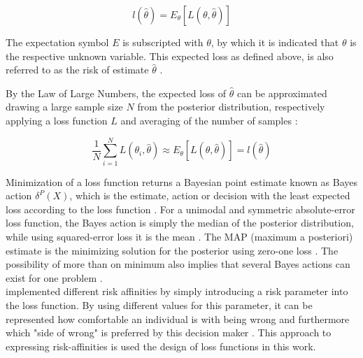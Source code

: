         \begin{equation}\label{eq:ExpectedLoss}
        l(\hat{\theta}) = E_{\theta}[L(\theta,\hat{\theta})]
        \end{equation}  
        
        The expectation symbol $E$ is subscripted with $\theta$, by which it is indicated that $\theta$ is the respective unknown variable. This expected loss as defined above, is also referred to as the risk of estimate $\hat{\theta}$ \citep{davidson2015}.
        
        By the Law of Large Numbers, the expected loss of $\hat{\theta}$ can be approximated drawing a large sample size $N$ from the posterior distribution, respectively applying a loss function $L$ and averaging of the number of samples \citep{davidson2015}:
        
        \begin{equation}\label{eq:ExpectedLoss2}
        \frac{1}{N}\sum_{i=1}^{N} L(\theta_i,\hat{\theta}) \approx E_{\theta}[L(\theta,\hat{\theta})] = l(\hat{\theta})
        \end{equation}
        
        Minimization of a loss function returns a Bayesian point estimate known as Bayes action $\delta^P(X)$, which is the estimate, action or decision with the least expected loss according to the loss function \citep{berger2013stat}. For a unimodal and symmetric absolute-error loss function, the Bayes action is simply the median of the posterior distribution, while using squared-error loss it is the mean \citep{davidson2015, berger2013stat}. The MAP (maximum a posteriori) estimate is the minimizing solution for the posterior using zero-one loss \citep{davidson2015}. The possibility of more than on minimum also implies that several Bayes actions can exist for one problem \citep{berger2013stat}.\\
        \citet{davidson2015} implemented different risk affinities by simply  introducing a risk parameter into the loss function. By using different values for this parameter, it can be represented how comfortable an individual is with being wrong and furthermore which "side of wrong" is preferred by this decision maker \citep{davidson2015}. This approach to expressing risk-affinities is used the design of loss functions in this work.
        
        
